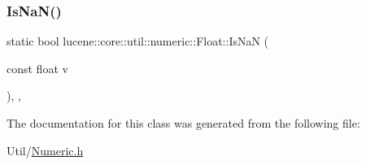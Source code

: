 \subsubsection{\texorpdfstring{Is\+Na\+N()}{IsNaN()}}
{\footnotesize\ttfamily static bool lucene\+::core\+::util\+::numeric\+::\+Float\+::\+Is\+NaN (\begin{DoxyParamCaption}\item[{const float}]{v }\end{DoxyParamCaption})\hspace{0.3cm}{\ttfamily [inline]}, {\ttfamily [static]}, {\ttfamily [noexcept]}}



The documentation for this class was generated from the following file\+:\begin{DoxyCompactItemize}
\item 
Util/\mbox{\hyperlink{Numeric_8h}{Numeric.\+h}}\end{DoxyCompactItemize}
